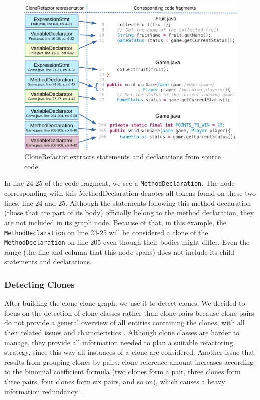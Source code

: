 \begin{figure}[H]
  \centering
  \includegraphics[width=1\columnwidth]{img/CloneGraphCode}
  \caption{CloneRefactor extracts statements and declarations from source code.}
  \label{fig:clonegraph}
\end{figure}

In line 24-25 of the code fragment, we see a \texttt{MethodDeclaration}. The node corresponding with this MethodDeclaration denotes all tokens found on these two lines, line 24 and 25. Although the statements following this method declaration (those that are part of its body) officially belong to the method declaration, they are not included in its graph node. Because of that, in this example, the \texttt{MethodDeclaration} on line 24-25 will be considered a clone of the \texttt{MethodDeclaration} on line 205 even though their bodies might differ. Even the range (the line and column that this node spans) does not include its child statements and declarations.

\subsubsection{Detecting Clones} \label{sec:detectingclones}
After building the clone clone graph, we use it to detect clones. We decided to focus on the detection of clone classes rather than clone pairs because clone pairs do not provide a general overview of all entities containing the clones, with all their related issues and characteristics \cite{fontana2012duplicated}. Although clone classes are harder to manage, they provide all information needed to plan a suitable refactoring strategy, since this way all instances of a clone are considered. Another issue that results from grouping clones by pairs: clone reference amount increases according to the binomial coefficient formula (two clones form a pair, three clones form three pairs, four clones form six pairs, and so on), which causes a heavy information redundancy \cite{fontana2012duplicated}.

